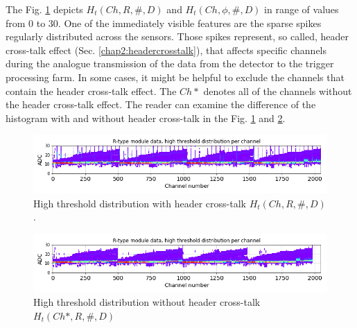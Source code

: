 The Fig. \ref{plot:P2-threshold-all-zoom} depicts $H_t(Ch, R, \#, D)$ and $H_t(Ch, \phi, \#, D)$ in range of values from 0 to 30.
One of the immediately visible features are the sparse spikes regularly distributed across the sensors.
Those spikes represent, so called, header cross-talk effect (Sec. \ref{chap2:headercrosstalk}), that affects specific channels during the analogue transmission of the data from the detector to the trigger processing farm.
In some cases, it might be helpful to exclude the channels that contain the header cross-talk effect.
The $Ch*$ denotes all of the channels without the header cross-talk effect.
The reader can examine the difference of the histogram with and without header cross-talk in the Fig. \ref{plot:P2-threshold-all-zoom} and \ref{plot:P2-threshold-all-zoom-nohc}.


\begin{figure}
    \centering
    \includegraphics[width=\linewidth]{figures/chapter4/calib_analysis/P2-threshold-all-zoom.png}
    \caption{High threshold distribution with header cross-talk $H_t(Ch, R, \#, D)$.}
    \label{plot:P2-threshold-all-zoom}
\end{figure}

\begin{figure}
    \centering
    \includegraphics[width=\linewidth]{figures/chapter4/calib_analysis/P2-threshold-all-zoom-nohc.png}
    \caption{High threshold distribution without header cross-talk $H_t(Ch*, R, \#, D)$}
    \label{plot:P2-threshold-all-zoom-nohc}
\end{figure}


